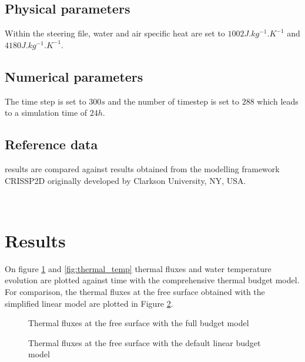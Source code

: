 \subsection{Physical parameters}
Within the \waqtel steering file, water and air specific heat are set to $1002J.kg^{-1}.K^{-1}$ and $4180 J.kg^{-1}.K^{-1}$.

\subsection{Numerical parameters}
The time step is set to $300s$ and the number of timestep is set to $288$ which leads to a simulation time of $24h$.

\subsection{Reference data}
\khione results are compared against results obtained from the modelling framework CRISSP2D originally developed by Clarkson University, NY, USA.

~\newline
\section{Results}
On figure \ref{fig:thermal_fluxes} and \ref{fig:thermal_temp} thermal fluxes and water temperature evolution are plotted against time with the comprehensive thermal budget model. 
For comparison, the thermal fluxes at the free surface obtained with the simplified linear model are plotted in Figure \ref{fig:thermal_fluxes_linear}.

\begin{figure}[H]
    \begin{center}
    \end{center}
    \caption{Thermal fluxes at the free surface with the full budget model}
    \label{fig:thermal_fluxes}
\end{figure}

\begin{figure}[H]
    \begin{center}
    \end{center}
    \caption{Thermal fluxes at the free surface with the default linear budget model}
    \label{fig:thermal_fluxes_linear}
\end{figure}

